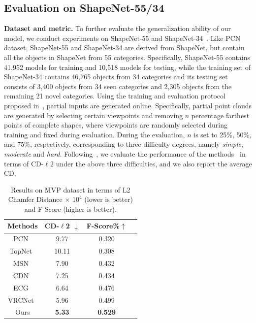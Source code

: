 \documentclass[letterpaper]{article} %
\begin{document}
{\subsection{Evaluation on ShapeNet-55/34}

{\bf{Dataset and metric.}} 
To further evaluate the generalization ability of our model, we conduct experiments on ShapeNet-55 and ShapeNet-34~\cite{yu2021pointr}. Like PCN dataset, ShapeNet-55 and ShapeNet-34 are derived from ShapeNet, but contain all the objects in ShapeNet from 55 categories.
Specifically, ShapeNet-55 contains 41,952 models for training and 10,518 models for testing,
while the training set of ShapeNet-34 contains 46,765 objects from 34 categories and its testing set consists of 3,400 objects from 34 seen categories and 2,305 objects from the remaining 21 novel categories. Using the training and evaluation protocol proposed in~\cite{yu2021pointr}, partial inputs are generated online. 
Specifically, partial point clouds are generated by selecting certain viewpoints and removing $n$ percentage farthest points of complete shapes, where viewpoints are randomly selected during training and  fixed during evaluation. 
During the evaluation, $n$ is set to 25\%, 50\%, and 75\%, respectively, corresponding to three difficulty degrees, namely {\textit {simple}}, {\textit {moderate}} and {\textit {hard}}. 
Following~\cite{yu2021pointr}, we evaluate the performance of the methods~\cite{yang2018foldingnet, yuan2018pcn, tchapmi2019topnet, huang2020pf, xie2020grnet, yu2021pointr, zhou2022seedformer} in terms of CD-$\ell$2 under the above three difficulties, and we also report the average CD. 

\begin{table}
\begin{center}
\small
\begin{tabular}{c|ccc}
\toprule
Methods  &CD-$\ell$2 $\downarrow$ &F-Score\%$\uparrow$ \\
\midrule
 PCN~\cite{yuan2018pcn} & 9.77 &0.320\\
 TopNet~\cite{tchapmi2019topnet} &10.11&0.308\\	
 MSN~\cite{liu2020morphing}	&7.90&0.432\\
 CDN~\cite{wang2020cascaded}	&7.25&0.434\\
 ECG~\cite{pan2020ecg}	&6.64&0.476\\
VRCNet~\cite{pan2021variational} &5.96&0.499\\	
\midrule
Ours&\bf{5.33} &\bf{0.529}\\
\bottomrule
\end{tabular}
\end{center}
\caption{Results on MVP dataset in terms of  L2 Chamfer Distance $\times$ $10^4$ (lower is better) and F-Score (higher is better). } \label{tab:mvp}
\end{table}



}
\end{document}
